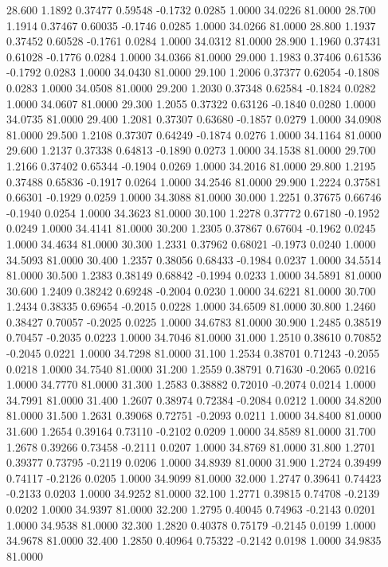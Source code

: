   28.600   1.1892   0.37477   0.59548  -0.1732   0.0285   1.0000  34.0226  81.0000
  28.700   1.1914   0.37467   0.60035  -0.1746   0.0285   1.0000  34.0266  81.0000
  28.800   1.1937   0.37452   0.60528  -0.1761   0.0284   1.0000  34.0312  81.0000
  28.900   1.1960   0.37431   0.61028  -0.1776   0.0284   1.0000  34.0366  81.0000
  29.000   1.1983   0.37406   0.61536  -0.1792   0.0283   1.0000  34.0430  81.0000
  29.100   1.2006   0.37377   0.62054  -0.1808   0.0283   1.0000  34.0508  81.0000
  29.200   1.2030   0.37348   0.62584  -0.1824   0.0282   1.0000  34.0607  81.0000
  29.300   1.2055   0.37322   0.63126  -0.1840   0.0280   1.0000  34.0735  81.0000
  29.400   1.2081   0.37307   0.63680  -0.1857   0.0279   1.0000  34.0908  81.0000
  29.500   1.2108   0.37307   0.64249  -0.1874   0.0276   1.0000  34.1164  81.0000
  29.600   1.2137   0.37338   0.64813  -0.1890   0.0273   1.0000  34.1538  81.0000
  29.700   1.2166   0.37402   0.65344  -0.1904   0.0269   1.0000  34.2016  81.0000
  29.800   1.2195   0.37488   0.65836  -0.1917   0.0264   1.0000  34.2546  81.0000
  29.900   1.2224   0.37581   0.66301  -0.1929   0.0259   1.0000  34.3088  81.0000
  30.000   1.2251   0.37675   0.66746  -0.1940   0.0254   1.0000  34.3623  81.0000
  30.100   1.2278   0.37772   0.67180  -0.1952   0.0249   1.0000  34.4141  81.0000
  30.200   1.2305   0.37867   0.67604  -0.1962   0.0245   1.0000  34.4634  81.0000
  30.300   1.2331   0.37962   0.68021  -0.1973   0.0240   1.0000  34.5093  81.0000
  30.400   1.2357   0.38056   0.68433  -0.1984   0.0237   1.0000  34.5514  81.0000
  30.500   1.2383   0.38149   0.68842  -0.1994   0.0233   1.0000  34.5891  81.0000
  30.600   1.2409   0.38242   0.69248  -0.2004   0.0230   1.0000  34.6221  81.0000
  30.700   1.2434   0.38335   0.69654  -0.2015   0.0228   1.0000  34.6509  81.0000
  30.800   1.2460   0.38427   0.70057  -0.2025   0.0225   1.0000  34.6783  81.0000
  30.900   1.2485   0.38519   0.70457  -0.2035   0.0223   1.0000  34.7046  81.0000
  31.000   1.2510   0.38610   0.70852  -0.2045   0.0221   1.0000  34.7298  81.0000
  31.100   1.2534   0.38701   0.71243  -0.2055   0.0218   1.0000  34.7540  81.0000
  31.200   1.2559   0.38791   0.71630  -0.2065   0.0216   1.0000  34.7770  81.0000
  31.300   1.2583   0.38882   0.72010  -0.2074   0.0214   1.0000  34.7991  81.0000
  31.400   1.2607   0.38974   0.72384  -0.2084   0.0212   1.0000  34.8200  81.0000
  31.500   1.2631   0.39068   0.72751  -0.2093   0.0211   1.0000  34.8400  81.0000
  31.600   1.2654   0.39164   0.73110  -0.2102   0.0209   1.0000  34.8589  81.0000
  31.700   1.2678   0.39266   0.73458  -0.2111   0.0207   1.0000  34.8769  81.0000
  31.800   1.2701   0.39377   0.73795  -0.2119   0.0206   1.0000  34.8939  81.0000
  31.900   1.2724   0.39499   0.74117  -0.2126   0.0205   1.0000  34.9099  81.0000
  32.000   1.2747   0.39641   0.74423  -0.2133   0.0203   1.0000  34.9252  81.0000
  32.100   1.2771   0.39815   0.74708  -0.2139   0.0202   1.0000  34.9397  81.0000
  32.200   1.2795   0.40045   0.74963  -0.2143   0.0201   1.0000  34.9538  81.0000
  32.300   1.2820   0.40378   0.75179  -0.2145   0.0199   1.0000  34.9678  81.0000
  32.400   1.2850   0.40964   0.75322  -0.2142   0.0198   1.0000  34.9835  81.0000
